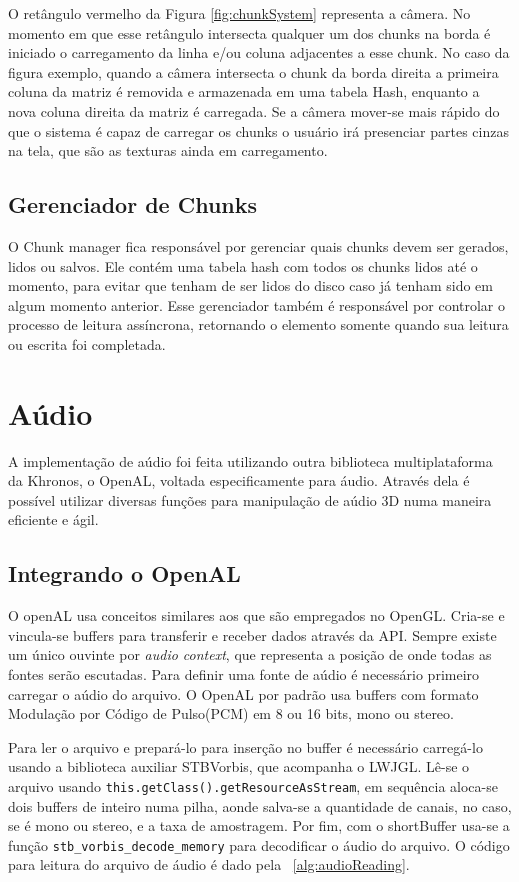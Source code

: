 \documentclass[12pt, 
openright, 
oneside, 
a4paper,    
brazil]{facom-ufu-abntex2}
\begin{document}
O retângulo vermelho da Figura \ref{fig:chunkSystem} representa a câmera. No momento em que esse retângulo intersecta qualquer um dos chunks na borda é iniciado o carregamento da linha e/ou coluna adjacentes a esse chunk. No caso da figura exemplo, quando a câmera intersecta o chunk da borda direita a primeira coluna da matriz é removida e armazenada em uma tabela Hash, enquanto a nova coluna direita da matriz é carregada. Se a câmera mover-se mais rápido do que o sistema é capaz de carregar os chunks o usuário irá presenciar partes cinzas na tela, que são as texturas ainda em carregamento.

\subsection{Gerenciador de Chunks}
O Chunk manager fica responsável por gerenciar quais chunks devem ser gerados, lidos ou salvos. Ele contém uma tabela hash com todos os chunks lidos até o momento, para evitar que tenham de ser lidos do disco caso já tenham sido em algum momento anterior.
Esse gerenciador também é responsável por controlar o processo de leitura assíncrona, retornando o elemento somente quando sua leitura ou escrita foi completada.

\section{Aúdio}
A implementação de aúdio foi feita utilizando outra biblioteca multiplataforma da Khronos, o OpenAL, voltada especificamente para áudio. Através dela é possível utilizar diversas funções para manipulação de aúdio 3D numa maneira eficiente e ágil. 

\subsection{Integrando o OpenAL}
O openAL usa conceitos similares aos que são empregados no OpenGL. Cria-se e vincula-se buffers para transferir e receber dados através da API.
Sempre existe um único ouvinte por \textit{audio context}, que representa a posição de onde todas as fontes serão escutadas. Para definir uma fonte de aúdio é necessário primeiro carregar o aúdio do arquivo. O OpenAL por padrão usa buffers com formato Modulação por Código de Pulso(PCM) em 8 ou 16 bits, mono ou stereo.

Para ler o arquivo e prepará-lo para inserção no buffer é necessário carregá-lo usando a biblioteca auxiliar STBVorbis, que acompanha o LWJGL.
Lê-se o arquivo usando \texttt{this.getClass().getResourceAsStream}, em sequência aloca-se dois buffers de inteiro numa pilha, aonde salva-se a quantidade de canais, no caso, se é mono ou stereo, e a taxa de amostragem.
Por fim, com o shortBuffer usa-se a função \texttt{stb_vorbis_decode_memory} para decodificar o áudio do arquivo. O código para leitura do arquivo de áudio é dado pela \lstlistingname~\ref{alg:audioReading}.
\end{document}
